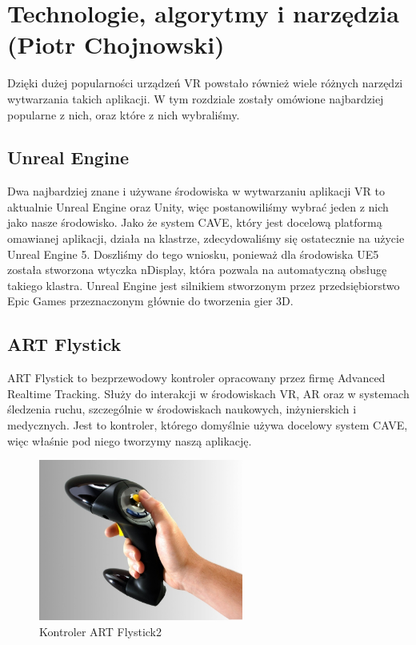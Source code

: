 \chapter{Technologie, algorytmy i narzędzia (Piotr Chojnowski)}
\label{chap:algs}

Dzięki dużej popularności urządzeń VR powstało również wiele różnych narzędzi wytwarzania takich aplikacji. W tym rozdziale zostały omówione najbardziej popularne z nich, oraz które z nich wybraliśmy.

\section{Unreal Engine}
Dwa najbardziej znane i używane środowiska w wytwarzaniu aplikacji VR to aktualnie Unreal Engine oraz Unity, więc postanowiliśmy wybrać jeden z nich jako nasze środowisko. Jako że system CAVE, który jest docelową platformą omawianej aplikacji, działa na klastrze, zdecydowaliśmy się ostatecznie na użycie Unreal Engine 5. Doszliśmy do tego wniosku, ponieważ dla środowiska UE5 została stworzona wtyczka nDisplay, która pozwala na automatyczną obsługę takiego klastra. Unreal Engine jest silnikiem stworzonym przez przedsiębiorstwo Epic Games przeznaczonym głównie do tworzenia gier 3D.

\section{ART Flystick}
ART Flystick to bezprzewodowy kontroler opracowany przez firmę Advanced Realtime Tracking. Służy do interakcji w środowiskach VR, AR oraz w systemach śledzenia ruchu, szczególnie w środowiskach naukowych, inżynierskich i medycznych. Jest to kontroler, którego domyślnie używa docelowy system CAVE, więc właśnie pod niego tworzymy naszą aplikację.
\newline
\begin{figure}[h!]
    \centering
    \includegraphics[width=0.6\textwidth]{images/ART Flystick2 small.jpg}
    \caption{Kontroler ART Flystick2 \cite{flystick_img}}
    \label{img:flystick}
\end{figure}

